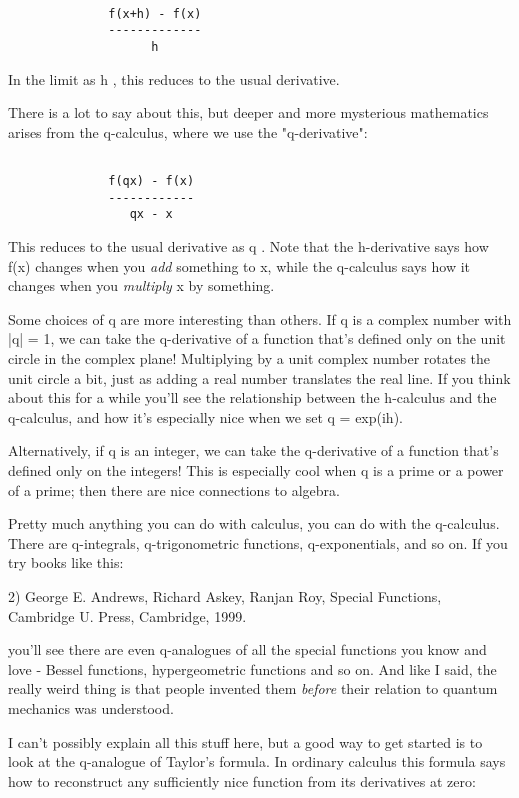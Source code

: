 \begin{verbatim}

              f(x+h) - f(x)
              -------------
                    h
\end{verbatim}
    
In the limit as h , this reduces to the usual derivative.


There is a lot to say about this, but deeper and more mysterious
mathematics arises from the q-calculus, where we use the
"q-derivative":


\begin{verbatim}

              f(qx) - f(x)
              ------------
                 qx - x
\end{verbatim}
    
This reduces to the usual derivative as q .  Note that the
h-derivative says how f(x) changes when you \emph{add} something to x, while
the q-calculus says how it changes when you \emph{multiply} x by something.

Some choices of q are more interesting than others.   If q is a complex
number with |q| = 1, we can take the q-derivative of a function that's
defined only on the unit circle in the complex plane!  Multiplying by a
unit complex number rotates the unit circle a bit, just as adding a real
number translates the real line.   If you think about this for a while
you'll see the relationship between the h-calculus and the q-calculus, 
and how it's especially nice when we set q = exp(ih).

Alternatively, if q is an integer, we can take the q-derivative of a
function that's defined only on the integers!  This is especially cool
when q is a prime or a power of a prime; then there are nice connections
to algebra.

Pretty much anything you can do with calculus, you can do with the
q-calculus.  There are q-integrals, q-trigonometric functions, 
q-exponentials, and so on.   If you try books like this:

2) George E. Andrews, Richard Askey, Ranjan Roy, Special Functions,
Cambridge U. Press, Cambridge, 1999.

you'll see there are even q-analogues of all the special functions you
know and love - Bessel functions, hypergeometric functions and so on. 
And like I said, the really weird thing is that people invented them
\emph{before} their relation to quantum mechanics was understood.

I can't possibly explain all this stuff here, but a good way to get
started is to look at the q-analogue of Taylor's formula.  In ordinary
calculus this formula says how to reconstruct any sufficiently nice
function from its derivatives at zero:


